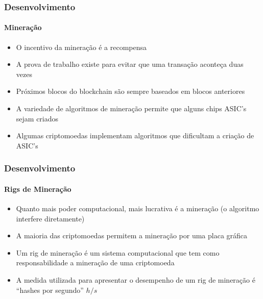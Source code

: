 \documentclass[aspectratio=43]{beamer}
\begin{document}
\begin{frame}
    \frametitle{Desenvolvimento}
    \framesubtitle{Mineração}

    \begin{itemize}
        \item O incentivo da mineração é a recompensa
            \cite{LChicarino}

        \item A prova de trabalho existe para evitar que uma transação
            aconteça duas vezes

        \item Próximos blocos do blockchain são sempre baseados em
            blocos anteriores \cite{Nakamoto2008, Dev2014}
        
        \item A variedade de algoritmos de mineração permite que
            alguns chips ASIC's sejam criados \cite{Smith1997}

        \item Algumas criptomoedas implementam algoritmos que
            dificultam a criação de ASIC's \cite{NiceHash2018}

    \end{itemize}
\end{frame}

\begin{frame}
    \frametitle{Desenvolvimento}
    \framesubtitle{Rigs de Mineração}

    \begin{itemize}
        \item Quanto mais poder computacional, mais lucrativa é a
            mineração (o algoritmo interfere diretamente)

        \item A maioria das criptomoedas permitem a mineração por uma
            placa gráfica

        \item Um rig de mineração é um sistema computacional que tem
            como responsabilidade a mineração de uma criptomoeda
            \cite{BitcoinWiki2015}

        \item A medida utilizada para apresentar o desempenho de um
            rig de mineração é ``hashes por segundo'' $h/s$

    \end{itemize}
\end{frame}
\end{document}
